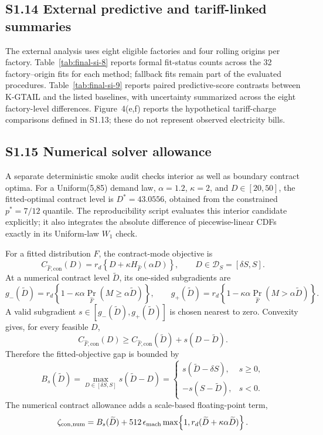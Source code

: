 \documentclass[]{interact}
\begin{document}
\subsection*{S1.14 External predictive and tariff-linked summaries}

The external analysis uses eight eligible factories and four rolling
origins per factory. Table~\ref{tab:final-si-8} reports formal fit-status
counts across the 32 factory--origin fits for each method; fallback fits
remain part of the evaluated procedures. Table~\ref{tab:final-si-9}
reports paired predictive-score contrasts between K-GTAIL and the listed
baselines, with uncertainty summarized across the eight factory-level
differences. Figure~4(e,f) reports the hypothetical tariff-charge
comparisons defined in S1.13; these do not represent observed
electricity bills.


\subsection*{S1.15 Numerical solver allowance}

A separate deterministic smoke audit checks interior as well as
boundary contract optima. For a Uniform(5,85) demand law,
$\alpha=1.2$, $\kappa=2$, and $D\in[20,50]$, the fitted-optimal
contract level is $D^*=43.0556$, obtained from the constrained
$p^*=7/12$ quantile. The reproducibility script evaluates this
interior candidate explicitly; it also integrates the absolute
difference of piecewise-linear CDFs exactly in its Uniform-law
$W_1$ check.

For a fitted distribution $\widehat F$, the contract-mode objective is
\[
C_{\widehat F,\mathrm{con}}(D)
=r_d\left\{D+\kappa H_{\widehat F}(\alpha D)\right\},
\qquad D\in\mathcal D_S=[\delta S,S].
\]
At a numerical contract level $\widetilde D$, its one-sided
subgradients are
\[
g_-(\widetilde D)
=r_d\left\{1-\kappa\alpha\Pr_{\widehat F}(M\geq\alpha\widetilde D)\right\},
\qquad
g_+(\widetilde D)
=r_d\left\{1-\kappa\alpha\Pr_{\widehat F}(M>\alpha\widetilde D)\right\}.
\]
A valid subgradient $s\in[g_-(\widetilde D),g_+(\widetilde D)]$ is
chosen nearest to zero. Convexity gives, for every feasible $D$,
\[
C_{\widehat F,\mathrm{con}}(D)
\geq
C_{\widehat F,\mathrm{con}}(\widetilde D)
+s(D-\widetilde D).
\]
Therefore the fitted-objective gap is bounded by
\[
B_s(\widetilde D)
=\max_{D\in[\delta S,S]}s(\widetilde D-D)
=\begin{cases}
s(\widetilde D-\delta S),&s\geq0,\\
-s(S-\widetilde D),&s<0.
\end{cases}
\]
The numerical contract allowance adds a scale-based floating-point
term,
\[
\zeta_{\mathrm{con,num}}
=B_s(\widetilde D)
+512\,\epsilon_{\rm mach}
\max\!\left\{1,
 r_d(\widetilde D+\kappa\alpha\widetilde D)\right\}.
\]
\end{document}
